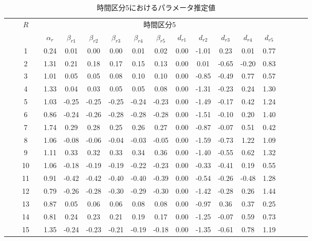 \documentclass[a4paper，11pt，oneside，openany]{jsbook}
\newcommand{\bhline}[1]{\noalign{\hrule height #1}}
\begin{document}
\begin{table}[h!]
\begin{center}
\caption{時間区分5におけるパラメータ推定値}
\setlength{\tabcolsep}{5.pt}
\begin{tabular}{ccccccccccccccccccc}  
\bhline{1pt}
& & \multirow{2}{*}{$R$} & & \multicolumn{11}{c}{時間区分5}     \\
\cline{5-15}
  & &  & & $\alpha_r$ & $\beta_{r1}$ & $\beta_{r2}$ & $\beta_{r3}$ & $\beta_{r4}$ & $\beta_{r5}$ & $d_{r1}$ & $d_{r2}$ & $d_{r3}$ & $d_{r4}$ & $d_{r5}$ \\
\bhline{1pt}
 &  & 1  &  & 0.24 & 0.01  & 0.00  & 0.00  & 0.01  & 0.02  & 0.00 & -1.01 & 0.23  & 0.01  & 0.77 \\
 &  & 2  &  & 1.31 & 0.21  & 0.18  & 0.17  & 0.15  & 0.13  & 0.00 & 0.01  & -0.65 & -0.20 & 0.83 \\
 &  & 3  &  & 1.01 & 0.05  & 0.05  & 0.08  & 0.10  & 0.10  & 0.00 & -0.85 & -0.49 & 0.77  & 0.57 \\
 &  & 4  &  & 1.33 & 0.04  & 0.03  & 0.05  & 0.05  & 0.08  & 0.00 & -1.31 & -0.23 & 0.24  & 1.30 \\
 &  & 5  &  & 1.03 & -0.25 & -0.25 & -0.25 & -0.24 & -0.23 & 0.00 & -1.49 & -0.17 & 0.42  & 1.24 \\
 &  & 6  &  & 0.86 & -0.24 & -0.26 & -0.28 & -0.28 & -0.28 & 0.00 & -1.51 & -0.10 & 0.20  & 1.40 \\
 &  & 7  &  & 1.74 & 0.29  & 0.28  & 0.25  & 0.26  & 0.27  & 0.00 & -0.87 & -0.07 & 0.51  & 0.42 \\
 &  & 8  &  & 1.06 & -0.08 & -0.06 & -0.04 & -0.03 & -0.05 & 0.00 & -1.59 & -0.73 & 1.22  & 1.09 \\
 &  & 9  &  & 1.11 & 0.33  & 0.32  & 0.33  & 0.34  & 0.36  & 0.00 & -1.40 & -0.55 & 0.62  & 1.32 \\
 &  & 10 &  & 1.06 & -0.18 & -0.19 & -0.19 & -0.22 & -0.23 & 0.00 & -0.33 & -0.41 & 0.19  & 0.55 \\
 &  & 11 &  & 0.91 & -0.42 & -0.42 & -0.40 & -0.40 & -0.39 & 0.00 & -0.54 & -0.26 & -0.48 & 1.28 \\
 &  & 12 &  & 0.79 & -0.26 & -0.28 & -0.30 & -0.29 & -0.30 & 0.00 & -1.42 & -0.28 & 0.26  & 1.44 \\
 &  & 13 &  & 0.87 & 0.05  & 0.06  & 0.06  & 0.08  & 0.08  & 0.00 & -0.97 & 0.36  & 0.37  & 0.25 \\
 &  & 14 &  & 0.81 & 0.24  & 0.23  & 0.21  & 0.19  & 0.17  & 0.00 & -1.25 & -0.07 & 0.59  & 0.73 \\
 &  & 15 &  & 1.35 & -0.24 & -0.23 & -0.21 & -0.19 & -0.18 & 0.00 & -1.35 & -0.61 & 0.78  & 1.19 \\

\end{tabular}
\end{center}
\end{table}
\end{document}
